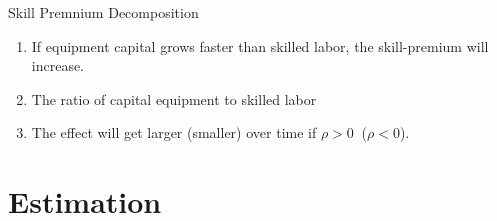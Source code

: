 \documentclass[notes,11pt, aspectratio=169]{beamer}
\newenvironment{wideitemize}{\itemize\addtolength{\itemsep}{10pt}}{\enditemize}
\begin{document}
\begin{frame}{Skill Premnium Decomposition}
\begin{wideitemize}
{\begin{enumerate}
\begin{wideitemize}
 \item If equipment capital grows faster than skilled labor, the skill-premium will increase.
 \end{wideitemize}
 \vspace{0.5cm}
 \item The ratio of capital equipment to skilled labor 
 \vspace{0.5cm}
 \begin{wideitemize}
 \item The effect will get larger (smaller) over time if $\rho > 0\:$ ($\rho < 0$). 
 \end{wideitemize}
 \end{enumerate} 
 }
\end{wideitemize}
\end{frame}

\section{Estimation}
\end{document}
